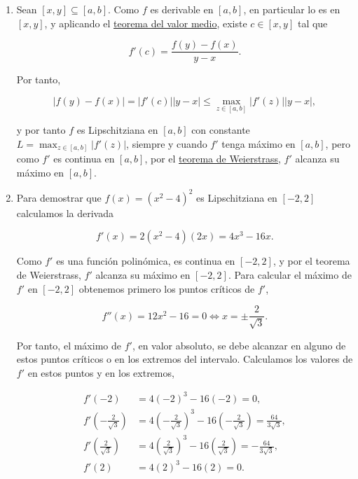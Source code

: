 \documentclass[
  spanish,
  a4paper,
]{scrreport}
\theoremstyle{definition}
\theoremstyle{remark}
\begin{document}
\begin{tcolorbox}[enhanced jigsaw, arc=.35mm, bottomrule=.15mm, bottomtitle=1mm, breakable, colback=white, colbacktitle=quarto-callout-tip-color!10!white, colframe=quarto-callout-tip-color-frame, coltitle=black, left=2mm, leftrule=.75mm, opacityback=0, opacitybacktitle=0.6, rightrule=.15mm, title=\textcolor{quarto-callout-tip-color}{\faLightbulb}\hspace{0.5em}{Solución}, titlerule=0mm, toprule=.15mm, toptitle=1mm]

\begin{enumerate}
\def\labelenumi{\alph{enumi}.}
\item
  Sean \([x,y]\subseteq [a,b]\). Como \(f\) es derivable en \([a,b]\),
  en particular lo es en \([x,y]\), y aplicando el
  \href{https://aprendeconalf.es/analisis-manual/07-derivadas.html\#thm-valor-medio}{teorema
  del valor medio}, existe \(c\in[x,y]\) tal que

  \[
  f'(c) = \frac{f(y)-f(x)}{y-x}.
  \]

  Por tanto,

  \[
  |f(y)-f(x)| = |f'(c)||y-x| \leq \max_{z\in [a,b]}|f'(z)||y-x|,
  \]

  y por tanto \(f\) es Lipschitziana en \([a,b]\) con constante
  \(L=\max_{z\in [a,b]}|f'(z)|\), siempre y cuando \(f'\) tenga máximo
  en \([a,b]\), pero como \(f'\) es continua en \([a,b]\), por el
  \href{https://aprendeconalf.es/analisis-manual/06-limites.html\#thm-weierstrass}{teorema
  de Weierstrass}, \(f'\) alcanza su máximo en \([a,b]\).
\item
  Para demostrar que \(f(x) = (x^2-4)^2\) es Lipschitziana en \([-2,2]\)
  calculamos la derivada

  \[
  f'(x) = 2(x^2-4)(2x) = 4x^3-16x.
  \]

  Como \(f'\) es una función polinómica, es continua en \([-2,2]\), y
  por el teorema de Weierstrass, \(f'\) alcanza su máximo en \([-2,2]\).
  Para calcular el máximo de \(f'\) en \([-2,2]\) obtenemos primero los
  puntos críticos de \(f'\),

  \[
  f''(x) = 12x^2-16 = 0 \Leftrightarrow x = \pm\frac{2}{\sqrt{3}}.
  \]

  Por tanto, el máximo de \(f'\), en valor absoluto, se debe alcanzar en
  alguno de estos puntos críticos o en los extremos del intervalo.
  Calculamos los valores de \(f'\) en estos puntos y en los extremos,

  \begin{align*}
  f'(-2) &= 4(-2)^3-16(-2) = 0,\\
  f'\left(-\frac{2}{\sqrt{3}}\right) &= 4\left(-\frac{2}{\sqrt{3}}\right)^3-16\left(-\frac{2}{\sqrt{3}}\right) = \frac{64}{3\sqrt{3}},\\
  f'\left(\frac{2}{\sqrt{3}}\right) &= 4\left(\frac{2}{\sqrt{3}}\right)^3-16\left(\frac{2}{\sqrt{3}}\right) = -\frac{64}{3\sqrt{3}},\\
  f'(2) &= 4(2)^3-16(2) = 0.
  \end{align*}


\end{enumerate}
\end{tcolorbox}
\end{document}
